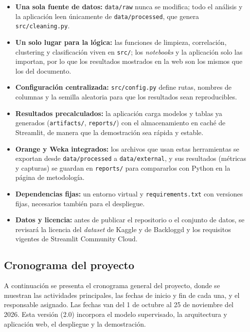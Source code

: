 \documentclass[letterpaper,11pt]{article}
\begin{document}
\begin{itemize}
  \item \textbf{Una sola fuente de datos:} \texttt{data/raw} nunca se modifica; todo el análisis y la aplicación leen únicamente de \texttt{data/processed}, que genera \texttt{src/cleaning.py}.
  \item \textbf{Un solo lugar para la lógica:} las funciones de limpieza, correlación, clustering y clasificación viven en \texttt{src/}; los \textit{notebooks} y la aplicación solo las importan, por lo que los resultados mostrados en la web son los mismos que los del documento.
  \item \textbf{Configuración centralizada:} \texttt{src/config.py} define rutas, nombres de columnas y la semilla aleatoria para que los resultados sean reproducibles.
  \item \textbf{Resultados precalculados:} la aplicación carga modelos y tablas ya generados (\texttt{artifacts/}, \texttt{reports/}) con el almacenamiento en caché de Streamlit, de manera que la demostración sea rápida y estable.
  \item \textbf{Orange y Weka integrados:} los archivos que usan estas herramientas se exportan desde \texttt{data/processed} a \texttt{data/external}, y sus resultados (métricas y capturas) se guardan en \texttt{reports/} para compararlos con Python en la página de metodología.
  \item \textbf{Dependencias fijas:} un entorno virtual y \texttt{requirements.txt} con versiones fijas, necesarios también para el despliegue.
  \item \textbf{Datos y licencia:} antes de publicar el repositorio o el conjunto de datos, se revisará la licencia del \textit{dataset} de Kaggle y de Backloggd y los requisitos vigentes de Streamlit Community Cloud.
\end{itemize}

\subsection*{Cronograma del proyecto}

A continuación se presenta el cronograma general del proyecto, donde se muestran las actividades principales, las fechas de inicio y fin de cada una, y el responsable asignado. Las fechas van del 1 de octubre al 25 de noviembre del 2026. Esta versión (2.0) incorpora el modelo supervisado, la arquitectura y aplicación web, el despliegue y la demostración.
\end{document}
